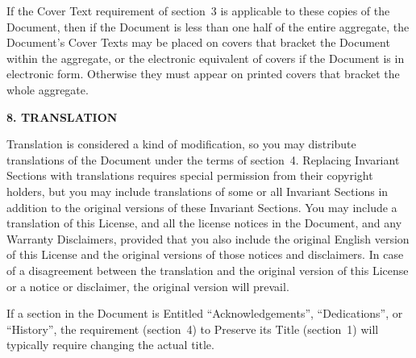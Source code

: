 \ifdefined\chs

\fi

\ifdefined\eng
If the Cover Text requirement of section~3 is applicable to these
copies of the Document, then if the Document is less than one half of
the entire aggregate, the Document's Cover Texts may be placed on
covers that bracket the Document within the aggregate, or the
electronic equivalent of covers if the Document is in electronic form.
Otherwise they must appear on printed covers that bracket the whole
aggregate.
\fi

\ifdefined\chs

\fi

\ifdefined\eng
\fi

\ifdefined\chs

\fi

\ifdefined\eng
\begin{center}
{\Large\bf 8. TRANSLATION\par}
\end{center}
\fi

\ifdefined\chs

\fi

\ifdefined\eng
\fi

\ifdefined\chs

\fi

\ifdefined\eng
Translation is considered a kind of modification, so you may
distribute translations of the Document under the terms of section~4.
Replacing Invariant Sections with translations requires special
permission from their copyright holders, but you may include
translations of some or all Invariant Sections in addition to the
original versions of these Invariant Sections.  You may include a
translation of this License, and all the license notices in the
Document, and any Warranty Disclaimers, provided that you also include
the original English version of this License and the original versions
of those notices and disclaimers.  In case of a disagreement between
the translation and the original version of this License or a notice
or disclaimer, the original version will prevail.
\fi

\ifdefined\chs

\fi

\ifdefined\eng
If a section in the Document is Entitled ``Acknowledgements'',
``Dedications'', or ``History'', the requirement (section~4) to Preserve
its Title (section~1) will typically require changing the actual
title.
\fi

\ifdefined\chs

